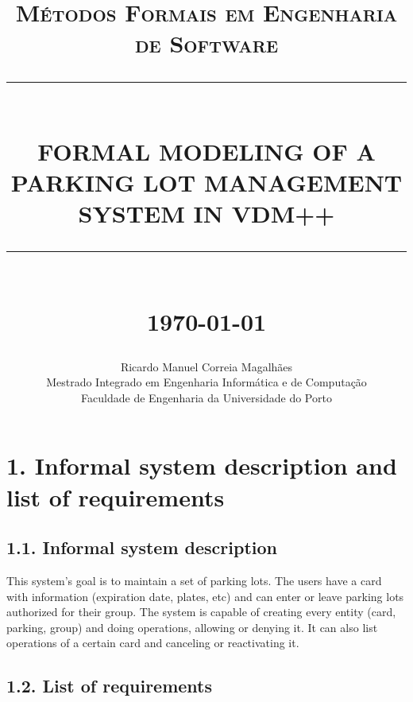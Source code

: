 \documentclass[12pt]{report}
\newcommand{\HRule}[1]{\rule{\linewidth}{#1}}
\begin{document}
\title{ \normalsize \textsc{Métodos Formais em Engenharia de Software}
		\\ [2.0cm]
		\HRule{0.5pt} \\
		\LARGE \textbf{\uppercase{Formal Modeling of a Parking Lot Management System in VDM++}}
		\HRule{2pt} \\ [0.5cm]
		\normalsize \today \vspace*{5\baselineskip}}

\date{}

\author{
		Ricardo Manuel Correia Magalhães \\ 
		Mestrado Integrado em Engenharia Informática e de Computação \\
		Faculdade de Engenharia da Universidade do Porto }

\maketitle
\tableofcontents
\newpage

\sectionfont{\scshape}


\section*{1. Informal system description and list of requirements}
\subsection*{1.1. Informal system description}

This system's goal is to maintain a set of parking lots. The users have a card with information (expiration date, plates, etc) and can enter or leave parking lots authorized for their group. The system is capable of creating every entity (card, parking, group) and doing operations, allowing or denying it. It can also list operations of a certain card and canceling or reactivating it.

\subsection*{1.2. List of requirements}
\end{document}
